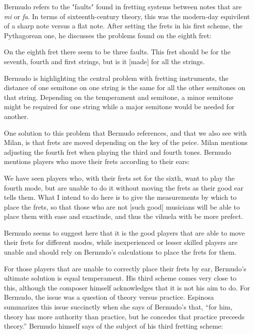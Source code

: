 Bermudo refers to the "faults" found in fretting systems between notes that are \textit{mi} or
\textit{fa}.  In terms of sixteenth-century theory, this was the modern-day
equivilent of a sharp note versus a flat note.  After setting the frets in his first scheme,
the Pythagorean one, he discusses the problems found on the eighth fret:
\begin{blocks}
On the eighth fret there seem to be three faults.  This fret should be  for the
seventh, fourth and first strings, but is it [made]  for all the strings.
\autocite[95]{DE:1}
\end{blocks}
Bermudo is highlighting the central problem with fretting instruments, the distance of one
semitone on one string is the same for all the other semitones on that string.  Depending
on the temperament and semitone, a minor semitone might be required for one string while
a major semitone would be needed for another.

One solution to this problem that Bermudo references, and that we also see with Milan, is
that frets are moved depending on the key of the peice.  Milan mentions adjusting the
fourth fret when playing the third and fourth tones.  Bermudo mentions players who move their
frets according to their ears:
\begin{blocks}
We have seen players who, with their frets set for the sixth, want to play the fourth mode,
but are unable to do it without moving the frets as their good ear tells them.  What I intend
to do here is to give the measurements by which to place the frets, so that those who are not
[such good] musicians will be able to place them with ease and exactiude, and thus the vihuela
with be more prefect.
\autocite[78]{DE:1}
\end{blocks}
Bermudo seems to suggest here that it is the good players that are able to move their frets
for different modes, while inexperienced or lesser skilled players are unable and should
rely on Bermudo's calculations to place the frets for them.

For those players that are unable to correctly place their frets by ear, Bermudo's ultimate
solution is equal temperament.  His third scheme comes very close to this, although the composer
himself acknowledges that it is not his aim to do.  For Bermudo,
the issue was a question of theory versus practice.  Espinosa summarizes this issue succinctly
when she says of Bermudo's that, ``for him, theory has more authority than practice, but he
concedes that practice preceeds theory.'' \autocite[xx]{DE:1}  Bermudo himself says of the subject of his third
fretting scheme:

